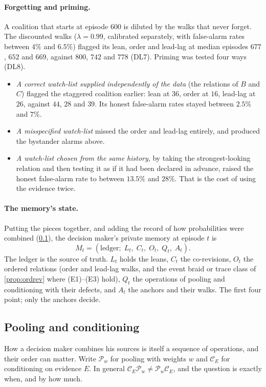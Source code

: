\documentclass[11pt]{article}
\theoremstyle{definition}\newtheorem{definition}[theorem]{Definition}\newtheorem{remark}[theorem]{Remark}\newtheorem{example}[theorem]{Example}\newtheorem{problem}[theorem]{Open problem}\crefname{problem}{Problem}{Problems}
\begin{document}
\paragraph{Forgetting and priming.} A coalition that starts at episode $600$ is diluted by the walks that never forget. The discounted walks ($\lambda=0.99$, calibrated separately, with false-alarm rates between $4\%$ and $6.5\%$) flagged its lean, order and lead-lag at median episodes $677$, $652$ and $669$, against $800$, $742$ and $778$ (DL7). Priming was tested four ways (DL8).
\begin{itemize}
\item \emph{A correct watch-list supplied independently of the data} (the relations of $B$ and $C$) flagged the staggered coalition earlier: lean at $36$, order at $16$, lead-lag at $26$, against $44$, $28$ and $39$. Its honest false-alarm rates stayed between $2.5\%$ and $7\%$.
\item \emph{A misspecified watch-list} missed the order and lead-lag entirely, and produced the bystander alarms above.
\item \emph{A watch-list chosen from the same history}, by taking the strongest-looking relation and then testing it as if it had been declared in advance, raised the honest false-alarm rate to between $13.5\%$ and $28\%$. That is the cost of using the evidence twice.
\end{itemize}

\paragraph{The memory's state.} Putting the pieces together, and adding the record of how probabilities were combined (\cref{sec:poolcond}), the decision maker's private memory at episode $t$ is
\[
M_t=(\text{ledger};\;L_t,\;C_t,\;O_t,\;Q_t,\;A_t).
\]
The ledger is the source of truth. $L_t$ holds the leans, $C_t$ the co-revisions, $O_t$ the ordered relations (order and lead-lag walks, and the event braid or trace class of \cref{prop:ordrev} where (E1)--(E3) hold), $Q_t$ the operations of pooling and conditioning with their defects, and $A_t$ the anchors and their walks. The first four point; only the anchors decide.

\subsection{Pooling and conditioning}\label{sec:poolcond}
How a decision maker combines his sources is itself a sequence of operations, and their order can matter. Write $\mathcal P_w$ for pooling with weights $w$ and $\mathcal C_E$ for conditioning on evidence $E$. In general $\mathcal C_E\mathcal P_w\ne\mathcal P_w\mathcal C_E$, and the question is exactly when, and by how much.
\end{document}
